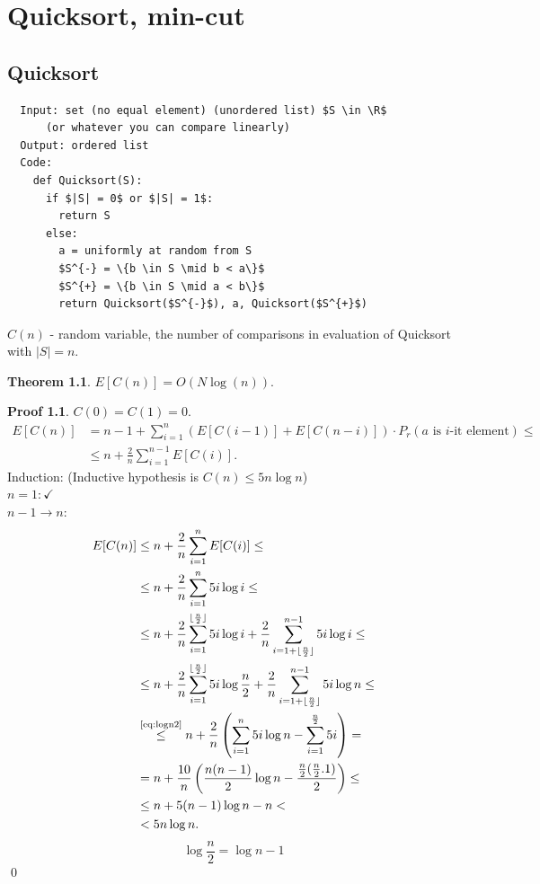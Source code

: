 \documentclass[a4paper, 12pt]{book}
\theoremstyle{definition}
\newtheorem{theorem}[counter]{Theorem}
\newtheorem{pro}[counter]{Proof}
\theoremstyle{remark}
\newcommand{\R}{\mathbb{R}}
\begin{document}
\chapter{Quicksort, min-cut}


\section{Quicksort}

\begin{lstlisting}
  Input: set (no equal element) (unordered list) $S \in \R$
      (or whatever you can compare linearly)
  Output: ordered list
  Code:
    def Quicksort(S):
      if $|S| = 0$ or $|S| = 1$:
        return S
      else:
        a = uniformly at random from S
        $S^{-} = \{b \in S \mid b < a\}$
        $S^{+} = \{b \in S \mid a < b\}$
        return Quicksort($S^{-}$), a, Quicksort($S^{+}$)
\end{lstlisting}
$C(n)$ - random variable, the number of comparisons in evaluation of Quicksort with $|S| = n$.
\begin{theorem}
  $E[C(n)] = O\left(N \log(n)\right)$.
\end{theorem}
\begin{pro}
  $C(0) = C(1) = 0$. \\
  \begin{align*}
    E[C(n)] &= n - 1 + \sum_{i=1}^{n} \left(E[C(i-1)] + E[C(n-i)]\right) \cdot P_r(a \text{ is $i$-it element}) \leq \\
    &\leq n + \frac{2}{n} \sum_{i=1}^{n-1} E[C(i)].
  \end{align*}
  Induction: (Inductive hypothesis is $C(n) \leq 5n\log{n}$)\\
  $n = 1: \checkmark$ \\
  $n-1 \to n$:
  \begin{align*}
    E[C(n)] &\leq n + \frac{2}{n} \sum_{i=1}^{n} E[C(i)] \leq \\
    &\leq n + \frac{2}{n} \sum_{i=1}^{n} 5i \log i \leq \\
    &\leq n + \frac{2}{n} \sum_{i=1}^{\lfloor\frac{n}{2}\rfloor} 5i \log i +
      \frac{2}{n} \sum_{i=1+\lfloor\frac{n}{2}\rfloor}^{n-1} 5i \log i \leq \\
    &\leq n + \frac{2}{n} \sum_{i=1}^{\lfloor\frac{n}{2}\rfloor} 5i \log \frac{n}{2} +
      \frac{2}{n} \sum_{i=1+\lfloor\frac{n}{2}\rfloor}^{n-1} 5i \log n \leq \\
    &\stackrel{\refeq{eq:logn2}}{\leq} n + \frac{2}{n} \left(\sum_{i=1}^n 5i \log n - \sum_{i=1}^{\frac{n}{2}} 5i\right) = \\
    &= n + \frac{10}{n} \left(\frac{n(n-1)}{2} \log n - \frac{\frac{n}{2} (\frac{n}{2} . 1)}{2}\right) \leq \\
    &\leq n + 5(n-1) \log n - n < \\
    &< 5n \log n.
  \end{align*}
  \begin{equation}
    \label{eq:logn2}
    \log \frac{n}{2} = \log n - 1
  \end{equation}
  \qed
\end{pro}
\end{document}
